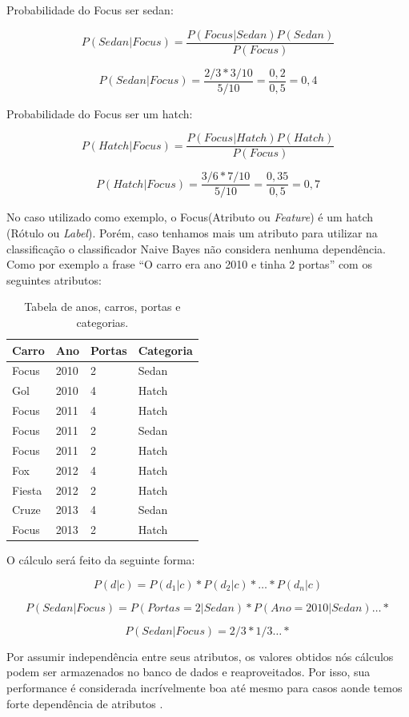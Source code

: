 Probabilidade do Focus ser sedan:

\[ P(Sedan|Focus) = \frac{P(Focus|Sedan) P(Sedan)}{P(Focus)}  \]

\[ P(Sedan|Focus) = \frac{2/3 * 3/10}{5/10} = \frac{0,2}{0,5} = 0,4\]

Probabilidade do Focus ser um hatch:

\[ P(Hatch|Focus) = \frac{P(Focus|Hatch) P(Hatch)}{P(Focus)}  \]

\[ P(Hatch|Focus) = \frac{3/6 * 7/10}{5/10} = \frac{0,35}{0,5} = 0,7\]

No caso utilizado como exemplo, o Focus(Atributo ou \textit{Feature}) é um hatch
(Rótulo ou \textit{Label}).
Porém, caso tenhamos mais um atributo para utilizar na classificação o classificador Naive Bayes não
considera nenhuma dependência.
Como por exemplo a frase ``O carro era ano 2010 e tinha 2 portas'' com os
seguintes atributos:

\begin{table}[htb]
\centering
\begin{tabular}{|l|l|l|l|}
\hline
Carro  & Ano  & Portas & Categoria \\ \hline
Focus  & 2010 & 2      & Sedan     \\ \hline
Gol    & 2010 & 4      & Hatch     \\ \hline
Focus  & 2011 & 4      & Hatch     \\ \hline
Focus  & 2011 & 2      & Sedan     \\ \hline
Focus  & 2011 & 2      & Hatch     \\ \hline
Fox    & 2012 & 4      & Hatch     \\ \hline
Fiesta & 2012 & 2      & Hatch     \\ \hline
Cruze  & 2013 & 4      & Sedan     \\ \hline
Focus  & 2013 & 2      & Hatch     \\ \hline
\end{tabular}
\caption{Tabela de anos, carros, portas e categorias.}
\label{my-label}
\end{table}

O cálculo será feito da seguinte forma:

\[ P(d|c) = P(d_1|c) * P(d_2|c)* \ldots * P(d_n|c) \]

\[ P(Sedan|Focus) = P(Portas=2|Sedan) * P(Ano=2010|Sedan) \ldots * \]

\[ P(Sedan|Focus) = 2/3 * 1/3 \ldots * \]

Por assumir independência entre seus atributos, os valores obtidos nós cálculos
podem ser armazenados no banco de dados e reaproveitados. Por isso, sua
performance é considerada incrívelmente boa até mesmo para casos aonde temos forte dependência de
atributos \cite{domingos97naivebayes}.

